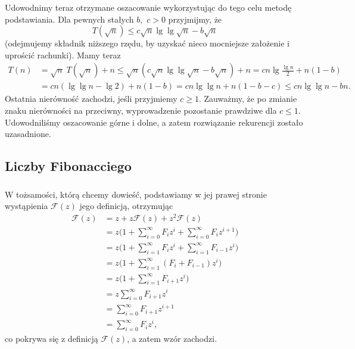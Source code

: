 Udowodnimy teraz otrzymane oszacowanie wykorzystując do tego celu metodę podstawiania. Dla pewnych stałych $b$,~$c>0$ przyjmijmy, że
\[
	T(\!\sqrt{n}) \le c\sqrt{n}\lg\lg\sqrt{n}-b\sqrt{n}
\]
(odejmujemy składnik niższego rzędu, by uzyskać nieco mocniejsze założenie i uprościć rachunki). Mamy teraz
\begin{align*}
	T(n) &= \sqrt{n}\;T(\!\sqrt{n})+n \le \sqrt{n}\left(c\sqrt{n}\lg\lg\sqrt{n}-b\sqrt{n}\right)+n = cn\lg\frac{\lg n}{2}+n(1-b) \\
	&= cn(\lg\lg n-\lg2)+n(1-b) = cn\lg\lg n+n(1-b-c) \le cn\lg\lg n-bn.
\end{align*}
Ostatnia nierówność zachodzi, jeśli przyjmiemy $c\ge1$. Zauważmy, że po zmianie znaku nierówności na przeciwny, wyprowadzenie pozostanie prawdziwe dla $c\le1$. Udowodniliśmy oszacowanie górne i dolne, a zatem rozwiązanie rekurencji zostało uzasadnione.

\subsection{Liczby Fibonacciego} %

\subsubsection{} %
W tożsamości, którą chcemy dowieść, podstawiamy w jej prawej stronie wystąpienia $\mathcal{F}(z)$ jego definicją, otrzymując
\begin{align*}
	\mathcal{F}(z) &= z+z\mathcal{F}(z)+z^2\mathcal{F}(z) \\
	&= z\biggl(1+\sum_{i=0}^\infty F_iz^i+\sum_{i=0}^\infty F_iz^{i+1}\biggr) \\
	&= z\biggl(1+\sum_{i=1}^\infty F_iz^i+\sum_{i=1}^\infty F_{i-1}z^i\biggr) \\
	&= z\biggl(1+\sum_{i=1}^\infty (F_i+F_{i-1})z^i\biggr) \\
	&= z\biggl(1+\sum_{i=1}^\infty F_{i+1}z^i\biggr) \\
	&= z\sum_{i=0}^\infty F_{i+1}z^i \\
	&= \sum_{i=0}^\infty F_{i+1}z^{i+1} \\
	&= \sum_{i=0}^\infty F_iz^i,
\end{align*}
co pokrywa się z definicją $\mathcal{F}(z)$, a zatem wzór zachodzi.

